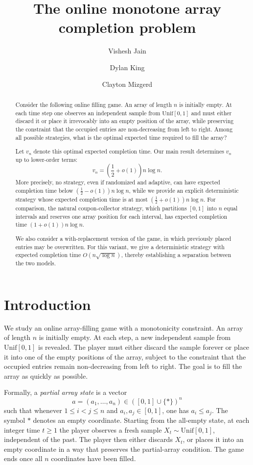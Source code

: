 \documentclass[11pt,reqno,letterpaper]{amsart}
\title{The online monotone array completion problem}
\author{Vishesh Jain}
\author{Dylan King}
\author{Clayton Mizgerd}
\theoremstyle{definition}
\numberwithin{equation}{section}
\newcommand{\paren}[1]{\left( #1 \right)}
\begin{document}
\begin{abstract}
Consider the following online filling game.  An array of length \(n\) is initially
empty.  At each time step one observes an independent sample from
\(\mathrm{Unif}[0,1]\) and must either discard it or place it irrevocably into an empty
position of the array, while preserving the constraint that the occupied entries are
non-decreasing from left to right.  Among all possible strategies, what is the
optimal expected time required to fill the array?

Let \(v_n\) denote this optimal expected completion time.  Our main result determines
\(v_n\) up to lower-order terms:
\[
v_n=\left(\frac12+o(1)\right)n\log n.
\]
More precisely, no strategy, even if randomized and adaptive, can have expected
completion time below \(\left(\frac12-o(1)\right)n\log n\), while we provide an explicit
deterministic strategy whose expected completion time is at most
\(\left(\frac12+o(1)\right)n\log n\).  For comparison, the natural coupon-collector
strategy, which partitions \([0,1]\) into \(n\) equal intervals and reserves one array
position for each interval, has expected completion time \((1+o(1))n\log n\).

We also consider a with-replacement version of the game, in which previously placed
entries may be overwritten.
For this variant, we give
a deterministic strategy with expected completion time \(O(n\sqrt{\log n})\), thereby
establishing a separation between the two models.
\end{abstract}


\maketitle

\section{Introduction}

We study an online array-filling game with a monotonicity constraint.  An array
of length \(n\) is initially empty.  At each step, a new independent sample from
\(\mathrm{Unif}[0,1]\) is revealed.  The player must either discard the sample forever
or place it into one of the empty positions of the array, subject to the constraint
that the occupied entries remain non-decreasing from left to right.  The goal is to
fill the array as quickly as possible.

Formally, a \emph{partial array state} is a vector
\[
a=(a_1,\dots,a_n)\in \paren{[0,1]\cup\{\ast\}}^n
\]
such that whenever \(1\le i<j\le n\) and \(a_i,a_j\in[0,1]\), one has
\(a_i\le a_j\).  The symbol \(\ast\) denotes an empty coordinate.  Starting from the
all-empty state, at each integer time \(t\geq 1\) the player observes a fresh sample
\(X_t\sim \mathrm{Unif}[0,1]\), independent of the past.  The player then either
discards \(X_t\), or places it into an empty coordinate in a way that preserves the
partial-array condition.  The game ends once all \(n\) coordinates have been filled.
\end{document}
